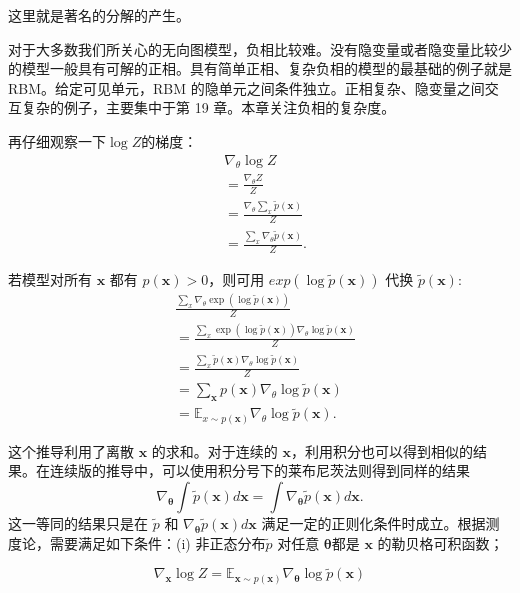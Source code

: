 这里就是著名的分解的产生。

对于大多数我们所关心的无向图模型，负相比较难。没有隐变量或者隐变量比较少的模型一般具有可解的正相。具有简单正相、复杂负相的模型的最基础的例子就是 RBM。给定可见单元，RBM 的隐单元之间条件独立。正相复杂、隐变量之间交互复杂的例子，主要集中于第 19 章。本章关注负相的复杂度。

再仔细观察一下\(\log Z\)的梯度：
\begin{align}
    & \nabla_\theta \log{Z}                                \\
    & = \frac{\nabla_\theta Z}{Z}                          \\
    & = \frac{\nabla_\theta\sum_x\widetilde{p}(\bm{x})}{Z} \\
    & = \frac{\sum_x\nabla_\theta\widetilde{p}(\bm{x})}{Z}.
\end{align}

若模型对所有 \(\bm{x}\) 都有 \(p(\bm{x})>0\)，则可用 \(exp(\log\widetilde{p}(\bm{x}))\) 代换 \(\widetilde{p}(\bm{x})\):
\begin{align}
& \frac{\sum_x\nabla_\theta\exp(
	\log{\widetilde{p}(\bm{x})})}{Z}             \\
& = \frac{\sum_x\exp(\log{\widetilde{p}(\bm{x})})
	\nabla_\theta\log{\widetilde{p}(\bm{x})}}{Z} \\
& = \frac{\sum_x\widetilde{p}(\bm{x})
	\nabla_\theta\log\widetilde{p}(\bm{x})}{Z}   \\
& = \sum_{\bm{x}}p(\bm{x})
	\nabla_\theta\log\widetilde{p}(\bm{x})       \\
& = \mathbb{E}_{x\sim{}p(\bm{x})}
	\nabla_\theta\log\widetilde{p}(\bm{x}).
\end{align}

这个推导利用了离散 \(\bm{x}\) 的求和。对于连续的 \(\bm{x}\)，利用积分也可以得到相似的结果。在连续版的推导中，可以使用积分号下的莱布尼茨法则得到同样的结果
\begin{equation}
    \nabla_{\bm{\theta}}\int\widetilde{p}(\bm{x})d\bm{x}
    = \int\nabla_{\bm\theta}\widetilde{p}(\bm{x})d\bm{x}.
\end{equation}
这一等同的结果只是在 \( \widetilde{p} \) 和 \( \nabla_{\bm\theta}\widetilde{p}(\bm{x})d\bm{x} \) 满足一定的正则化条件时成立。根据测度论，需要满足如下条件：(i) 非正态分布\( \widetilde{p} \) 对任意 \(\bm{\theta}\)都是 \(\bm{x}\) 的勒贝格可积函数；

\begin{equation}
    \nabla_{\bm{x}}\log{}Z
    = \mathbb{E}_{\bm{x}\sim{}p(\bm{x})}
    \nabla_{\bm{\theta}}\log\widetilde{p}(\bm{x})
\end{equation}

